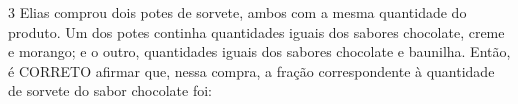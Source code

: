 





\num{3}  Elias comprou dois potes de sorvete, ambos com a mesma quantidade do
produto. Um dos potes continha quantidades iguais dos sabores chocolate,
creme e morango; e o outro, quantidades iguais dos sabores chocolate e
baunilha. Então, é CORRETO afirmar que, nessa compra, a fração
correspondente à quantidade de sorvete do sabor chocolate foi:

